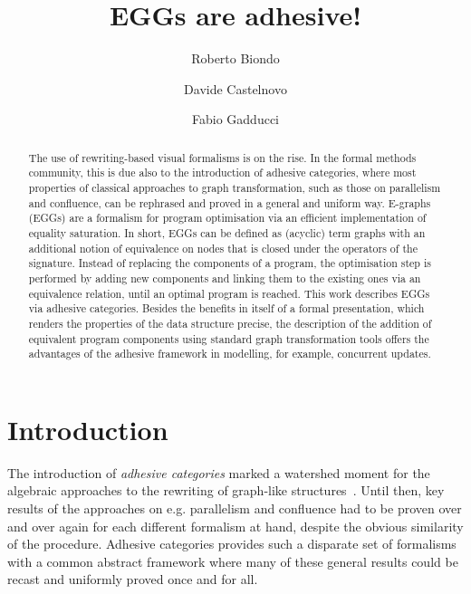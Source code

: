 \documentclass[a4paper,UKenglish,cleveref,pdftex,thm-restate,numberwithinsect]{lipics-v2021}
\title{EGGs are adhesive!}
\author{Roberto Biondo}
{Department of Computer Science, University of Pisa, Pisa, IT}
{r.biondo@studenti.unipi.it}{}{}
\author{Davide Castelnovo}
{Department of Computer Science, University of Pisa, Pisa, IT}
{castelnovod@gmail.com}
{https://orcid.org/0000-0002-5926-5615}{}
\author{Fabio Gadducci}
{Department of Computer Science, University of Pisa, Pisa, IT}
{fabio.gadducci@unipi.it}
{https://orcid.org/0000-0003-0690-3051}{}
\begin{document}
\maketitle

\begin{abstract}
The use of rewriting-based visual formalisms is on the rise. 
%
In the formal methods community, this is due also to the introduction of adhesive
categories, where most properties of classical approaches to graph transformation, 
such as those on parallelism and confluence, can be rephrased and proved in a general and 
uniform way.
%
E-graphs (EGGs) are a formalism for program optimisation 
via an efficient implementation of equality saturation. 
In short, EGGs can be  defined as (acyclic) term graphs with an additional notion of 
equivalence on nodes that is closed under the operators of the signature.
Instead of replacing the components of a program, the optimisation step 
is performed by adding new components and linking them to 
the existing ones via an equivalence relation, until an optimal program is reached.
%
This work describes EGGs via adhesive categories. 
Besides the benefits in itself of a formal presentation, which renders the 
properties of the data structure precise, the description of the addition of equivalent 
program components using standard graph transformation tools offers the advantages 
of the adhesive framework in modelling, for example, concurrent updates.
%
\end{abstract}


\section{Introduction}
The introduction of \emph{adhesive categories} marked a watershed moment for the algebraic approaches 
to the rewriting of graph-like structures~\cite{lack2005adhesive,ehrig2006fundamentals}.
%
Until then, key results of the approaches on e.g. parallelism and confluence had to be proven 
over and over again for each different formalism at hand, %
despite the obvious similarity of the procedure.
%
Adhesive categories provides such a disparate set of formalisms with a common abstract framework 
where many of these general results could be recast and uniformly proved once and for all.
 
\end{document}
